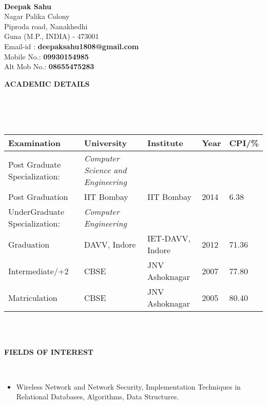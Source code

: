 \documentclass[a4paper,10pt]{article}
\newcommand{\lsep}{-0.5cm}
\newcommand{\resheading}[1]{{\small \colorbox{mygrey}{\begin{minipage}{0.975\textwidth}{\textbf{#1 \vphantom{p\^{E}}}}\end{minipage}}}}
\begin{document}
\hspace{0.5cm}\\[-0.2cm]

\textbf{Deepak Sahu} \\
\indent Nagar Palika Colony \\
\indent Piproda road, Nanakhedhi \\
\indent Guna (M.P., INDIA) - 473001 \\
\indent Email-id : \textbf{deepaksahu1808@gmail.com} \\
\indent Mobile No.: \textbf{09930154985} \\
\indent Alt Mob No.: \textbf{08655475283} \\

\resheading{\textbf{ACADEMIC DETAILS} }\\[\lsep]
\\ \\
\indent \begin{tabular}{ l @{\hskip 0.15in} l @{\hskip 0.15in} l @{\hskip 0.15in} l @{\hskip 0.15in} l }
\hline
\textbf{Examination} & \textbf{University} & \textbf{Institute} & \textbf{Year} & \textbf{CPI/\%} \\
\hline
Post Graduate Specialization:\,\, & \textit{Computer Science and Engineering} \\
Post Graduation & IIT Bombay & IIT Bombay & 2014 & 6.38 \\
UnderGraduate Specialization: & \textit{Computer Engineering} \\
Graduation & DAVV, Indore & IET-DAVV, Indore & 2012 & 71.36 \\
Intermediate/+2 & CBSE & JNV Ashoknagar & 2007 & 77.80 \\
Matriculation & CBSE & JNV Ashoknagar & 2005 & 80.40 \\
\hline
\end{tabular}
\\ \\

\resheading{\textbf{FIELDS OF INTEREST} }\\[\lsep]
\begin{itemize}
\item \noindent Wireless Network and Network Security, Implementation Techniques in Relational Databases, Algorithms, Data Structures.
\end{itemize}
\end{document}

